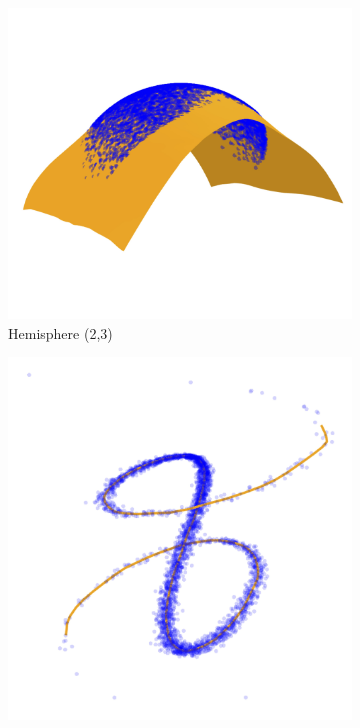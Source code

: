\begin{figure}[t]
    \centering
    \begin{subfigure}[b]{0.32\textwidth}
        \centering
        \includegraphics[width=\textwidth]{Chapter5/results/visualisations/RAE/projections/hemisphere_2_3/riemannian_autoencoder.jpg}
        \caption{Hemisphere (2,3)}
    \end{subfigure}
    \hfill
    \begin{subfigure}[b]{0.32\textwidth}
        \centering
        \includegraphics[width=\textwidth]{Chapter5/results/visualisations/RAE/projections/sinusoid_1_3/riemannian_autoencoder.jpg}

\end{subfigure}
\end{figure}
